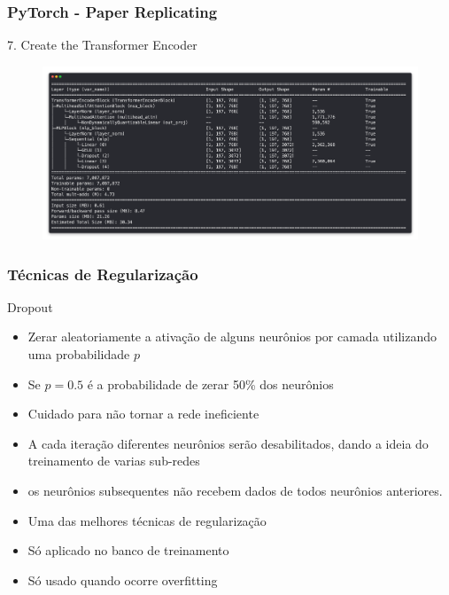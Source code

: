 \documentclass{beamer}
\begin{document}
\begin{frame}
	\frametitle{PyTorch - Paper Replicating}
	\begin{block}{7. Create the Transformer Encoder}
		\begin{figure}
			\centering
			\includegraphics[width=1\linewidth]{figures/final_model}
		\end{figure}
		
		
	\end{block}
\end{frame}
\begin{frame}
	\frametitle{Técnicas de Regularização}
	\begin{block}{Dropout}
		\begin{itemize}
			\item Zerar aleatoriamente a ativação de alguns neurônios por camada utilizando uma probabilidade $p$
			\item Se $p=0.5$ é a probabilidade de zerar 50\% dos neurônios
			\item Cuidado para não tornar a rede ineficiente
			\item A cada iteração diferentes neurônios serão desabilitados, dando a ideia do treinamento de varias sub-redes
			\item os neurônios subsequentes não recebem dados de todos neurônios anteriores.
			\item Uma das melhores técnicas de regularização
			\item Só aplicado no banco de treinamento
			\item Só usado quando ocorre overfitting
		\end{itemize}
	\end{block}
\end{frame}
\end{document}
